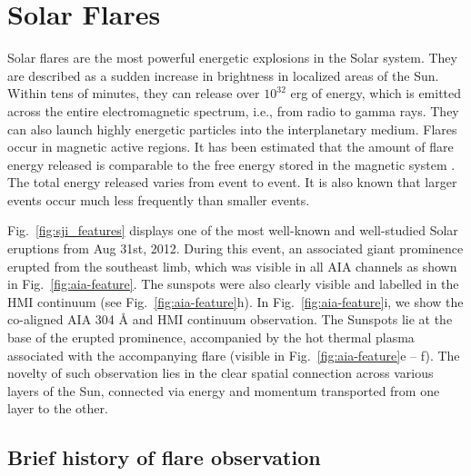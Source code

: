 

\section{Solar Flares}\label{sol_flr}

Solar flares are the most powerful energetic explosions in the Solar system. They are described as a sudden increase in brightness in localized areas of the Sun. Within tens of minutes, they can release over $10^{32}$ erg of energy, which is emitted across the entire electromagnetic spectrum, i.e., from radio to gamma rays. They can also launch highly energetic particles into the interplanetary medium. Flares occur in magnetic active regions. It has been estimated that the amount of flare energy released is comparable to the free energy stored in the magnetic system \citep{emslie12,ash17}. %
The total energy released varies from event to event. It is also known that larger events occur much less frequently than smaller events.

Fig.~\ref{fig:sji_features} displays one of the most well-known and well-studied Solar eruptions from Aug 31st, 2012. During this event, an associated giant prominence erupted from the southeast limb, which was visible in all AIA channels as shown in Fig.~\ref{fig:aia-feature}. The sunspots were also clearly visible and labelled in the HMI continuum (see Fig.~\ref{fig:aia-feature}h). In Fig.~\ref{fig:aia-feature}i, we show the co-aligned AIA 304 {\AA} and HMI continuum observation. The Sunspots lie at the base of the erupted prominence, accompanied by the hot thermal plasma associated with the accompanying flare (visible in Fig.~\ref{fig:aia-feature}e {--} f). The novelty of such observation lies in the clear spatial connection across various layers of the Sun, connected via energy and momentum transported from one layer to the other.

\subsection{Brief history of flare observation}\label{sol_flr_1}

